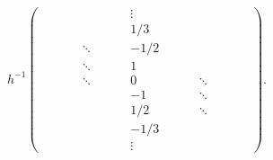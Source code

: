 \begin{equation}
h^{-1}
\begin{pmatrix}
&&&&&&&&\vdots&&&&&&&&\\
&&&&&&&&1/3&&&&&&&&\\
&&&&\ddots&&&&-1/2&&&&&&&&\\
&&&&\ddots&&&&1&&&&&&&&\\
&&&&\ddots&&&&0&&&&\ddots&&&&\\
&&&&&&&&-1&&&&\ddots&&&&\\
&&&&&&&&1/2&&&&\ddots&&&&\\
&&&&&&&&-1/3&&&&&&&&\\
&&&&&&&&\vdots&&&&&&
\end{pmatrix}.~
\end{equation}







































